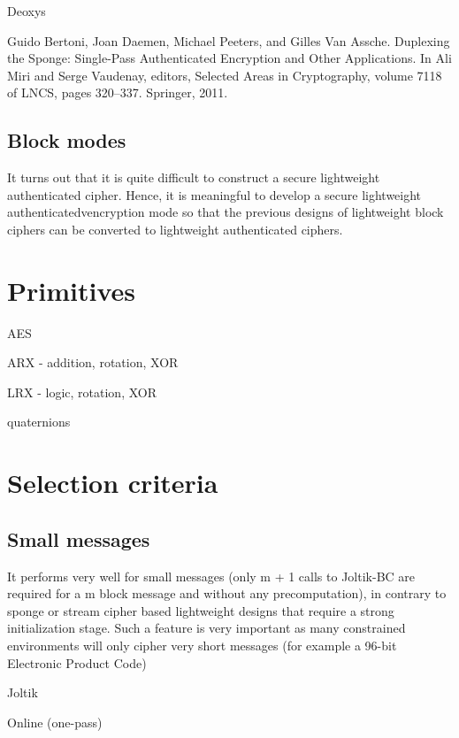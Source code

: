 Deoxys

Guido Bertoni, Joan Daemen, Michael Peeters, and Gilles Van Assche. Duplexing the Sponge: Single-Pass
Authenticated Encryption and Other Applications. In Ali Miri and Serge Vaudenay, editors, Selected Areas
in Cryptography, volume 7118 of LNCS, pages 320–337. Springer, 2011.

\subsection{Block modes}

It turns out that it is quite difficult to construct a secure lightweight authenticated cipher. Hence, it is meaningful to develop a secure lightweight authenticatedvencryption mode so that the previous designs of lightweight block ciphers can be converted to lightweight authenticated ciphers.

\section{Primitives}

AES

ARX - addition, rotation, XOR

LRX - logic, rotation, XOR

quaternions

\section{Selection criteria}

\subsection{Small messages}

It performs very well for small messages (only m + 1 calls to Joltik-BC are required for a m
block message and without any precomputation), in contrary to sponge or stream cipher based
lightweight designs that require a strong initialization stage. Such a feature is very important
as many constrained environments will only cipher very short messages (for example a 96-bit
Electronic Product Code)

Joltik

\begin{description}
  \item[Online (one-pass)]
\end{description}









